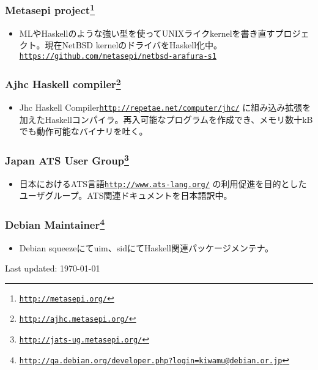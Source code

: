 \documentclass[letterpaper]{article}
\def\footer{
  \begin{center}
    \begin{footnotesize}
      Last updated: \today
    \end{footnotesize}
  \end{center}
}
\begin{document}
\subsubsection*{Metasepi project\footnote{\href{http://metasepi.org/}{\tt http://metasepi.org/}}}
\begin{itemize}
\item MLやHaskellのような強い型を使ってUNIXライクkernelを書き直すプロジェクト。現在NetBSD kernelのドライバをHaskell化中。 \href{https://github.com/metasepi/netbsd-arafura-s1}{\tt https://github.com/metasepi/netbsd-arafura-s1}
\end{itemize}

\subsubsection*{Ajhc Haskell compiler\footnote{\href{http://ajhc.metasepi.org/}{\tt http://ajhc.metasepi.org/}}}
\begin{itemize}
\item Jhc Haskell Compiler\href{http://repetae.net/computer/jhc/}{\tt http://repetae.net/computer/jhc/} に組み込み拡張を加えたHaskellコンパイラ。再入可能なプログラムを作成でき、メモリ数十kBでも動作可能なバイナリを吐く。
\end{itemize}

\subsubsection*{Japan ATS User Group\footnote{\href{http://jats-ug.metasepi.org/}{\tt http://jats-ug.metasepi.org/}}}
\begin{itemize}
\item 日本におけるATS言語\href{http://www.ats-lang.org/}{\tt http://www.ats-lang.org/} の利用促進を目的としたユーザグループ。ATS関連ドキュメントを日本語訳中。
\end{itemize}

\subsubsection*{Debian Maintainer\footnote{\href{http://qa.debian.org/developer.php?login=kiwamu@debian.or.jp}{\tt http://qa.debian.org/developer.php?login=kiwamu@debian.or.jp}}}
\begin{itemize}
\item Debian squeezeにてuim、sidにてHaskell関連パッケージメンテナ。
\end{itemize}

\bigskip
\footer
\end{document}
